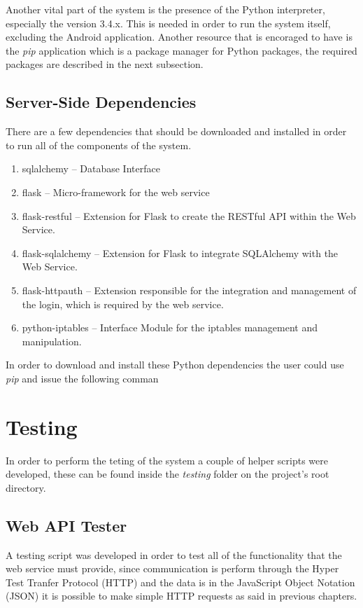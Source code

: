 Another vital part of the system is the presence of the Python interpreter,
especially the version 3.4.x. This is needed in order to run the system itself,
excluding the Android application. Another resource that is encoraged to have is
the \emph{pip} application which is a package manager for Python packages, the
required packages are described in the next subsection.

\subsection{Server-Side Dependencies}
\label{chap5:sec:inst-usg:sub:rasp-prep}
There are a few dependencies that should be downloaded and installed in order to
run all of the components of the system.

\begin{enumerate}
	\item sqlalchemy -- Database Interface
	\item flask -- Micro-framework for the web service
	\item flask-restful -- Extension for Flask to create the RESTful API within
		the Web Service.
	\item flask-sqlalchemy -- Extension for Flask to integrate SQLAlchemy with
		the Web Service.
	\item flask-httpauth -- Extension responsible for the integration and
		management of the login, which is required by the web service.
	\item python-iptables -- Interface Module for the iptables management and
		manipulation.
\end{enumerate}

In order to download and install these Python dependencies the user could use
\emph{pip} and issue the following comman

\section{Testing}
\label{chap4:sec:testing}
In order to perform the teting of the system a couple of helper scripts were
developed, these can be found inside the \emph{testing} folder on the project's
root directory.

\subsection{Web API Tester}
\label{chap5:sec:testing:api}
A testing script was developed in order to test all of the functionality that
the web service must provide, since communication is perform through the Hyper
Test Tranfer Protocol (HTTP) and the data is in the JavaScript Object Notation
(JSON) it is possible to make simple HTTP requests as said in previous
chapters.


